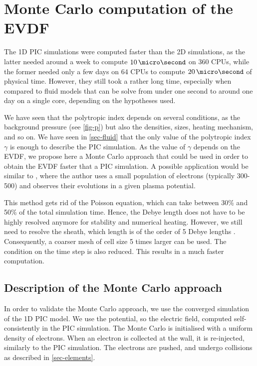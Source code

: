 
\section{Monte Carlo computation of the EVDF}
\label{sec-MCM}
  
  The \ac{1D} \ac{PIC} simulations were computed faster than the \ac{2D} simulations, as the latter needed around a week to compute $10\,\micro\second$ on 360 CPUs, while the former needed only a few days on 64 CPUs to compute $20\,\micro\second$ of physical time.
  However, they still took a rather long time, especially when compared to fluid models that can be solve from under one second to around one day on a single core, depending on the hypotheses used.
  
  We have seen that the polytropic index depends on several conditions, as the background pressure (see \cref{fig-p}) but also the densities, sizes, heating mechanism, and so on.
  We have seen in \cref{sec-fluid} that the only value of the polytropic index $\gamma$ is enough to describe the \ac{PIC} simulation.
  As the value of $\gamma$ depends on the \ac{EVDF}, we propose here a Monte Carlo approach that could be used in order to obtain the \ac{EVDF} faster that a \ac{PIC} simulation.
  A possible application would be similar to \citet{kushner1983}, where the author uses a small population of electrons (typically 300-500) and observes their evolutions in a given plasma potential.
  
  This method gets rid of the Poisson equation, which can take between 30\% and 50\% of the total simulation time.
  Hence, the Debye length does not have to be highly resolved anymore for stability and numerical heating.
  However, we still need to resolve the sheath, which length is of the order of 5 Debye lengths \citep{chabert2014}.
  Consequently, a coarser mesh of cell size 5 times larger can be used.
  The condition on the time step is also reduced.
  This results in a much faster computation.

  \subsection{Description of the Monte Carlo approach}

    In order to validate the Monte Carlo approach, we use the converged simulation of the \ac{1D} \ac{PIC} model.
    We use the potential, so the electric field, computed self-consistently in the \ac{PIC} simulation.
    The Monte Carlo is initialised with a uniform density of electrons.
    When an electron is collected at the wall, it is re-injected, similarly to the \ac{PIC} simulation.
    The electrons are pushed, and undergo collisions as described in \cref{sec-elements}.

